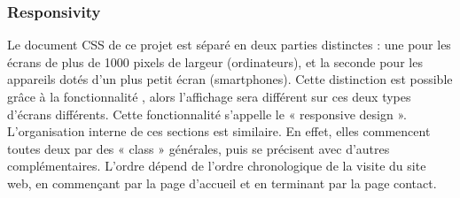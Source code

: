 \documentclass[a4,10pt,french]{sphinxmanual}
\begin{document}
\subsubsection{Responsivity}
\label{\detokenize{chapitre-02:responsivity}}
\sphinxAtStartPar
Le document CSS de ce projet est séparé en deux parties distinctes : une pour les écrans de plus de 1000 pixels de largeur (ordinateurs), et la seconde pour les appareils dotés d’un plus petit écran (smartphones). Cette distinction est possible grâce à la fonctionnalité , alors l’affichage sera différent sur ces deux types d’écrans différents. Cette fonctionnalité s’appelle le « responsive design ». L’organisation interne de ces sections est similaire. En effet, elles commencent toutes deux par des « class » générales, puis se précisent avec d’autres  complémentaires. L’ordre dépend de l’ordre chronologique de la visite du site web, en commençant par la page d’accueil et en terminant par la page contact.
\end{document}
